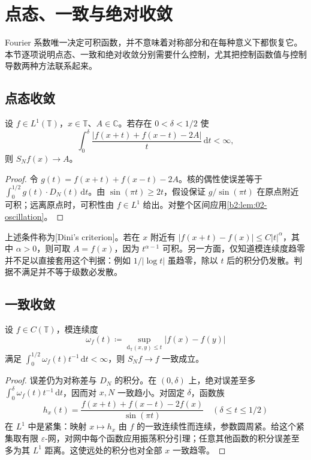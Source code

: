 \section{点态、一致与绝对收敛}
\label{b2:sec:0205}

Fourier 系数唯一决定可积函数，并不意味着对称部分和在每种意义下都恢复它。本节逐项说明点态、一致和绝对收敛分别需要什么控制，尤其把控制函数值与控制导数两种方法联系起来。

\subsection{点态收敛}
\label{b2:subsec:020501}

\begin{theorem}[Dini 判据]\label{b2:thm:02-dini}
设 \(f\in L^1(\mathbb T)\)，\(x\in\mathbb T\)、\(A\in\mathbb C\)。若存在 \(0<\delta<1/2\) 使
\[
 \int_0^\delta\dfrac{|f(x+t)+f(x-t)-2A|}{t}\,\mathrm{d}t<\infty,
\]
则 \(S_Nf(x)\to A\)。
\end{theorem}
\begin{proof}
令 \(g(t)=f(x+t)+f(x-t)-2A\)。核的偶性使误差等于 \(\int_0^{1/2}g(t)\cdot D_N(t)\,\mathrm{d}t\)。由 \(\sin(\pi t)\geq2t\)，假设保证 \(g/\sin(\pi t)\) 在原点附近可积；远离原点时，可积性由 \(f\in L^1\) 给出。对整个区间应用\cref{b2:lem:02-oscillation}。
\end{proof}

上述条件称为[Dini's criterion]。若在 \(x\) 附近有 \(|f(x+t)-f(x)|\leq C|t|^\alpha\)，其中 \(\alpha>0\)，则可取 \(A=f(x)\)，因为 \(t^{\alpha-1}\) 可积。另一方面，仅知道模连续度趋零并不足以直接套用这个判据：例如 \(1/|\log t|\) 虽趋零，除以 \(t\) 后的积分仍发散。判据不满足并不等于级数必发散。

\subsection{一致收敛}
\label{b2:subsec:020502}

\begin{proposition}\label{b2:prop:02-uniform-dini}
设 \(f\in C(\mathbb T)\)，模连续度
\[
 \omega_f(t)\coloneqq\sup_{\mathrm{d}_{\mathbb T}(x,y)\leq t}|f(x)-f(y)|
\]
满足 \(\int_0^{1/2}\omega_f(t)t^{-1}\,\mathrm{d}t<\infty\)，则 \(S_Nf\to f\) 一致成立。
\end{proposition}
\begin{proof}
误差仍为对称差与 \(D_N\) 的积分。在 \((0,\delta)\) 上，绝对误差至多 \(\int_0^\delta\omega_f(t)t^{-1}\,\mathrm{d}t\)，因而对 \(x,N\) 一致趋小。对固定 \(\delta\)，函数族
\[
 h_x(t)=\dfrac{f(x+t)+f(x-t)-2f(x)}{\sin(\pi t)}\quad(\delta\leq t\leq1/2)
\]
在 \(L^1\) 中是紧集：映射 \(x\mapsto h_x\) 由 \(f\) 的一致连续性而连续，参数圆周紧。给这个紧集取有限 \(\varepsilon\)-网，对网中每个函数应用振荡积分引理；任意其他函数的积分误差至多为其 \(L^1\) 距离。这使远处的积分也对全部 \(x\) 一致趋零。
\end{proof}

